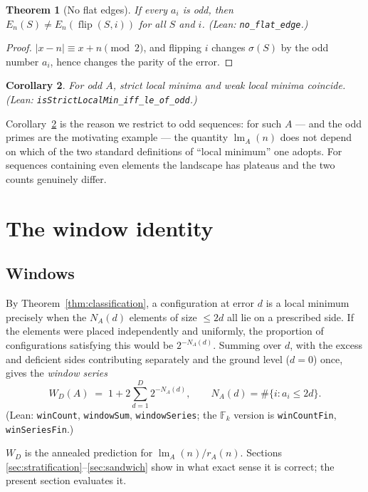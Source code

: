 \documentclass[11pt,a4paper]{article}
\theoremstyle{plain}
\newtheorem{theorem}{Theorem}[section]
\newtheorem{corollary}[theorem]{Corollary}
\theoremstyle{definition}
\theoremstyle{remark}
\DeclareMathOperator{\lm}{lm}
\newcommand{\Fk}{\mathbb{F}_k}
\newcommand{\Lean}[1]{\texttt{#1}}
\begin{document}
\begin{theorem}[No flat edges]\label{thm:no-flat}
If every $a_i$ is odd, then $E_n(S)\ne E_n(\operatorname{flip}(S,i))$ for all $S$
and $i$. \textup{(Lean: \Lean{no\_flat\_edge}.)}
\end{theorem}

\begin{proof}
$|x-n|\equiv x+n\pmod2$, and flipping $i$ changes $\sigma(S)$ by the odd number
$a_i$, hence changes the parity of the error.
\end{proof}

\begin{corollary}\label{cor:strict-eq-weak}
For odd $A$, strict local minima and weak local minima coincide.
\textup{(Lean: \Lean{isStrictLocalMin\_iff\_le\_of\_odd}.)}
\end{corollary}

Corollary~\ref{cor:strict-eq-weak} is the reason we restrict to odd sequences:
for such $A$ --- and the odd primes are the motivating example --- the quantity
$\lm_A(n)$ does not depend on which of the two standard definitions of ``local
minimum'' one adopts. For sequences containing even elements the landscape has
plateaus and the two counts genuinely differ.

\section{The window identity}\label{sec:window}

\subsection{Windows}

By Theorem~\ref{thm:classification}, a configuration at error $d$ is a local
minimum precisely when the $N_A(d)$ elements of size $\le2d$ all lie on a
prescribed side. If the elements were placed independently and uniformly, the
proportion of configurations satisfying this would be $2^{-N_A(d)}$. Summing
over $d$, with the excess and deficient sides contributing separately and the
ground level ($d=0$) once, gives the \emph{window series}
\[
  W_D(A)\;=\;1+2\sum_{d=1}^{D}2^{-N_A(d)},
  \qquad N_A(d)=\#\{i:a_i\le2d\}.
\]
(Lean: \Lean{winCount}, \Lean{windowSum}, \Lean{windowSeries}; the $\Fk$ version
is \Lean{winCountFin}, \Lean{winSeriesFin}.)

$W_D$ is the annealed prediction for $\lm_A(n)/r_A(n)$. Sections
\ref{sec:stratification}--\ref{sec:sandwich} show in what exact sense it is
correct; the present section evaluates it.
\end{document}
